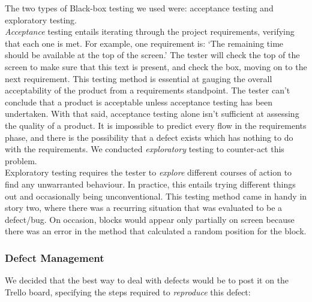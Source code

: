 \documentclass[12pt]{article}
\begin{document}
The two types of Black-box testing we used were: acceptance testing and exploratory testing. \\

\emph{Acceptance} testing entails iterating through the project requirements, verifying that each one is met. For example, one requirement is: `The remaining time should be available at the top of the screen.' The tester will check the top of the screen to make sure that this text is present, and check the box, moving on to the next requirement. This testing method is essential at gauging the overall acceptability of the product from a requirements standpoint. The tester can't conclude that a product is acceptable unless acceptance testing has been undertaken. With that said, acceptance testing alone isn't sufficient at assessing the quality of a product. It is impossible to predict every flow in the requirements phase, and there is the possibility that a defect exists which has nothing to do with the requirements. We conducted \emph{exploratory} testing to counter-act this problem.\\

Exploratory testing requires the tester to \emph{explore} different courses of action to find any unwarranted behaviour. In practice, this entails trying different things out and occasionally being unconventional. This testing method came in handy in story two, where there was a recurring situation that was evaluated to be a defect/bug. On occasion, blocks would appear only partially on screen because there was an error in the method that calculated a random position for the block.

\subsubsection{Defect Management}

We decided that the best way to deal with defects would be to post it on the Trello board, specifying the steps required to \emph{reproduce} this defect:
\end{document}
